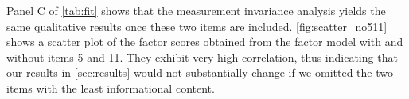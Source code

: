 Panel C of \autoref{tab:fit} shows that the measurement invariance analysis yields the same qualitative results once these two items are included. \autoref{fig:scatter_no511} shows a scatter plot of the factor scores obtained from the factor model with and without items 5 and 11. They exhibit very high correlation, thus indicating that our results in \autoref{sec:results} would not substantially change if we omitted the two items with the least informational content.









